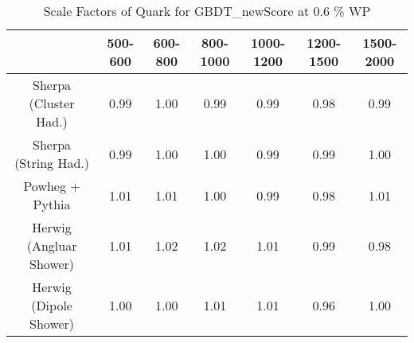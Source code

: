 \begin{table}
\centering
\caption{Scale Factors of Quark for GBDT_newScore at 0.6 \% WP}
\label{tab:SF_MC_GBDT_newScore_0.6_Quark}
\begin{tabular}{ccccccc}
\toprule
{} &  500-600 &  600-800 &  800-1000 &  1000-1200 &  1200-1500 &  1500-2000 \\
\midrule
Sherpa (Cluster Had.)   &     0.99 &     1.00 &      0.99 &       0.99 &       0.98 &       0.99 \\
Sherpa (String Had.)    &     0.99 &     1.00 &      1.00 &       0.99 &       0.99 &       1.00 \\
Powheg + Pythia         &     1.01 &     1.01 &      1.00 &       0.99 &       0.98 &       1.01 \\
Herwig (Angluar Shower) &     1.01 &     1.02 &      1.02 &       1.01 &       0.99 &       0.98 \\
Herwig (Dipole Shower)  &     1.00 &     1.00 &      1.01 &       1.01 &       0.96 &       1.00 \\
\bottomrule
\end{tabular}
\end{table}
